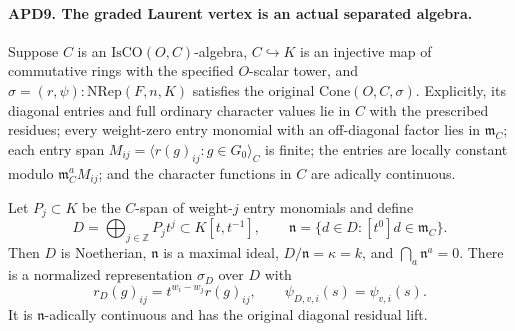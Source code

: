 \paragraph{APD9. The graded Laurent vertex is an actual separated algebra.}
\label{claim:APD9}
Suppose \(C\) is an \(\mathrm{IsCO}(O,C)\)-algebra,
\(C\hookrightarrow K\) is an injective map of commutative
rings with the specified \(O\)-scalar tower, and
\(\sigma=(r,\psi):\mathrm{NRep}(F,n,K)\) satisfies the original
\(\mathrm{Cone}(O,C,\sigma)\).  Explicitly, its diagonal
entries and full ordinary character values lie in \(C\) with
the prescribed residues; every weight-zero entry monomial with
an off-diagonal factor lies in \(\mathfrak m_C\); each entry
span \(M_{ij}=\langle r(g)_{ij}:g\in G_0\rangle_C\) is
finite; the entries are locally constant modulo
\(\mathfrak m_C^aM_{ij}\); and the character functions in
\(C\) are adically continuous.

Let \(P_j\subset K\) be the \(C\)-span of weight-\(j\)
entry monomials and define
\[
 D=\bigoplus_{j\in\mathbb Z}P_jt^j\subset K[t,t^{-1}],
 \qquad
 \mathfrak n=\{d\in D:[t^0]d\in\mathfrak m_C\}.            \tag{APD.18}
\]
Then \(D\) is Noetherian, \(\mathfrak n\) is a maximal ideal,
\(D/\mathfrak n=\kappa=k\), and
\(\bigcap_a\mathfrak n^a=0\).  There is a normalized
representation \(\sigma_D\) over \(D\) with
\[
 r_D(g)_{ij}=t^{w_i-w_j}r(g)_{ij},\qquad
 \psi_{D,v,i}(s)=\psi_{v,i}(s).                            \tag{APD.19}
\]
It is \(\mathfrak n\)-adically continuous and has the original
diagonal residual lift.

